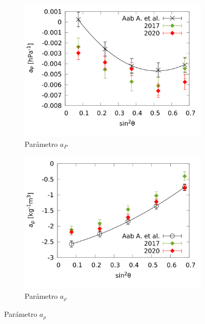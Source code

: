        \begin{figure}[H]
          \begin{subfigure}[b]{0.5\textwidth}
          \includegraphics[width=\linewidth]{../0_Introduccion/params/ap_2017_2020_above_1EeV.png}
          \caption{Parámetro $a_P$ }
          \end{subfigure}%
          \hspace{\fill}
          \begin{subfigure}[b]{0.5\textwidth}
          \includegraphics[width=\linewidth]{../0_Introduccion/params/arho_2017_2020_above_1EeV.png}
          \caption{Parámetro $a_{\rho}$ }
          \end{subfigure}%
          \hspace{\fill}

\end{figure}
